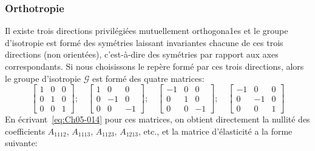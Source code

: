 \subsubsection{Orthotropie}
Il existe trois directions privilégiées mutuellement orthogona1es et le groupe d'isotropie est formé des symétries laissant invariantes chacune de ces trois directions (non orientées), c'est-à-dire des symétries par rapport aux axes correspondants.
Si nous choisissons le repère formé par ces trois directions, alors le groupe d'isotropie $\mathcal{G}$ est formé des quatre matrices:
\begin{equation}
    \begin{bmatrix}
        1 & 0 & 0 \\
        0 & 1 & 0 \\
        0 & 0 & 1
    \end{bmatrix};
    \quad
    \begin{bmatrix}
        1 & 0 & 0 \\
        0 & -1 & 0 \\
        0 & 0 & -1
    \end{bmatrix};
    \quad
    \begin{bmatrix}
        -1 & 0 & 0 \\
        0 & 1 & 0 \\
        0 & 0 & -1
    \end{bmatrix};
    \quad
    \begin{bmatrix}
        -1 & 0 & 0 \\
        0 & -1 & 0 \\
        0 & 0 & 1
    \end{bmatrix}
    \label{eq:Ch05-015}
\end{equation}
En écrivant~\eqref{eq:Ch05-014} pour ces matrices, on obtient directement la nullité des coefficients $A_{1112}$, $A_{1113}$, $A_{1123}$, $A_{1213}$, etc., et la matrice d'élasticité a la forme suivante: 
